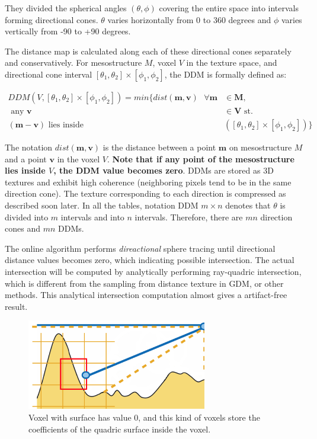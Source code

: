 They divided the spherical angles $(\theta,\phi)$ covering the entire space into intervals forming directional cones. $\theta$ varies horizontally from 0 to 360 degrees and $\phi$ varies vertically from -90 to +90 degrees.

The distance map is calculated along each of these directional cones separately and conservatively. For mesostructure $M$, voxel $V$ in the texture space, and directional cone interval $[\theta_{1},\theta_{2}]\times [\phi_{1},\phi_{2}]$, the DDM is formally defined as:

\begin{equation}
\begin{split}
	DDM(V,[\theta_{1},\theta_{2}]\times [\phi_{1},\phi_{2}])=min\{dist(\mathbf{m},\mathbf{v})\textrm{ }\forall\mathbf{m} & \in\mathbf{M},\\
	\textrm{ any } \mathbf{v} & \in\mathbf{V} \textrm{ st. } \\
	(\mathbf{m}-\mathbf{v}) \textrm{ lies inside }&([\theta_{1},\theta_{2}]\times [\phi_{1},\phi_{2}])\}
\end{split}
\end{equation}

The notation $dist(\mathbf{m},\mathbf{v})$ is the distance between a point $\mathbf{m}$ on mesostructure $M$ and a point $\mathbf{v}$ in the voxel $V$. \textbf{Note that if any point of the mesostructure lies inside $V$, the DDM value becomes zero}. DDMs are stored as 3D textures and exhibit high coherence (neighboring pixels tend to be in the same direction cone). The texture corresponding to each direction is compressed as described soon later. In all the tables, notation DDM $m\times n$ denotes that $\theta$ is divided into $m$ intervals and into $n$ intervals. Therefore, there are $mn$ direction cones and $mn$ DDMs.

The online algorithm performs \textit{direactional} sphere tracing until directional distance values becomes zero, which indicating possible intersection. The actual intersection will be computed by analytically performing ray-quadric intersection, which is different from the sampling from distance texture in GDM, or other methods. This analytical intersection computation almost gives a artifact-free result.

\begin{figure}
	\begin{center}
		\includegraphics[width=0.7\textwidth]{graphics/df/ddm-2}
	\end{center}
	\caption{Voxel with surface has value 0, and this kind of voxels store the coefficients of the quadric surface inside the voxel.}
\end{figure}


